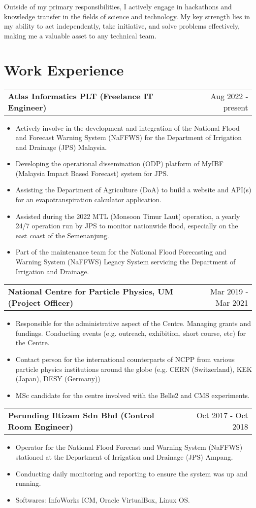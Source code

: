 \documentclass[a4paper,12pt]{article}
\makeatletter
\newenvironment{joblong}[2]
    {
    \begin{tabularx}{\linewidth}{@{}l X r@{}}
    \textbf{#1} & \hfill &  #2 \\[3.75pt]
    \end{tabularx}
    \begin{minipage}[t]{\linewidth}
    \begin{itemize}[nosep,after=\strut, leftmargin=1em, itemsep=3pt,label=--]
    }
    {
    \end{itemize}
    \end{minipage}    
    }
\makeatother
\begin{document}
Outside of my primary responsibilities, I actively engage in hackathons and knowledge transfer in the fields of science and technology. My key strength lies in my ability to act independently, take initiative, and solve problems effectively, making me a valuable asset to any technical team.


\section{Work Experience}

\begin{joblong}{Atlas Informatics PLT (Freelance IT Engineer)}{Aug 2022 - present}
\item Actively involve in the development and integration of the National Flood and Forecast Warning System (NaFFWS) for the Department of Irrigation and Drainage (JPS) Malaysia.
\item Developing the operational dissemination (ODP) platform of MyIBF (Malaysia Impact Based Forecast) system for JPS.
\item Assisting the Department of Agriculture (DoA) to build a website and API(s) for an evapotranspiration calculator application.
\item Assisted during the 2022 MTL (Monsoon Timur Laut) operation, a yearly 24/7 operation run by JPS to monitor nationwide flood, especially on the east coast of the Semenanjung.
\item Part of the maintenance team for the National Flood Forecasting and Warning System (NaFFWS) Legacy System servicing the Department of Irrigation and Drainage.
\end{joblong}


\begin{joblong}{National Centre for Particle Physics, UM (Project Officer)}{Mar 2019 - Mar 2021}
\item Responsible for the administrative aspect of the Centre. Managing grants and fundings. Conducting events (e.g. outreach, exhibition, short course, etc) for the Centre.
\item Contact person for the international counterparts of NCPP from various particle physics institutions around the globe (e.g. CERN (Switzerland), KEK (Japan), DESY (Germany))
\item MSc candidate for the centre involved with the Belle2 and CMS experiments.
\end{joblong}

\begin{joblong}{Perunding Iltizam Sdn Bhd (Control Room Engineer)}{Oct 2017 - Oct 2018}
\item Operator for the National Flood Forecast and Warning System (NaFFWS) stationed at the Department of Irrigation and Drainage (JPS) Ampang.
\item Conducting daily monitoring and reporting to ensure the system was up and running.
\item Softwares: InfoWorks ICM, Oracle VirtualBox, Linux OS.
\end{joblong}
\end{document}
